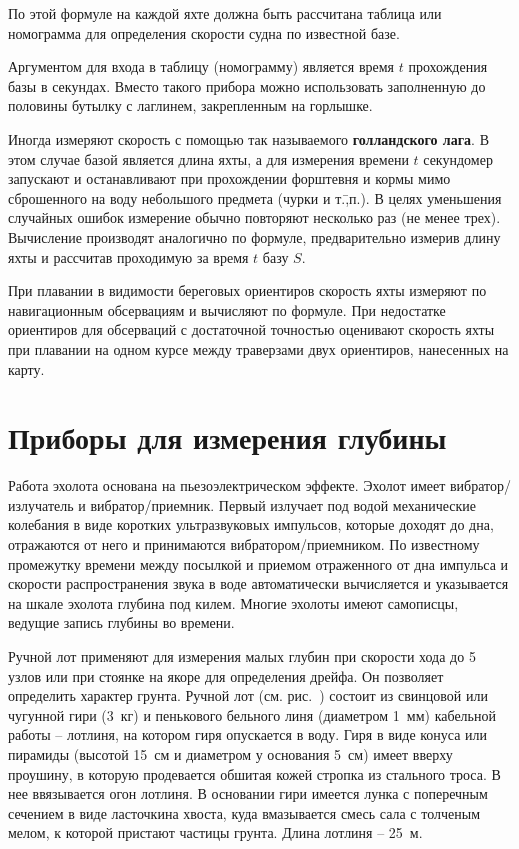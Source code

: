 По этой формуле на каждой яхте должна быть рассчитана таблица или
номограмма для определения скорости судна по известной базе.

Аргументом для входа в таблицу (номограмму) является время $t$
прохождения базы в секундах. Вместо такого прибора можно использовать
заполненную до половины бутылку с лаглинем, закрепленным на горлышке.

Иногда измеряют скорость с помощью так называемого
\textbf{голландского лага}.  В этом случае
базой является длина яхты, а для измерения времени $t$ секундомер
запускают и останавливают при прохождении форштевня и кормы мимо
сброшенного на воду небольшого предмета (чурки и т.\=,п.). В целях
уменьшения случайных ошибок измерение обычно повторяют несколько раз
(не менее трех). Вычисление производят аналогично по формуле,
предварительно измерив длину яхты и рассчитав проходимую за время $t$
базу $S$.

При плавании в видимости береговых ориентиров скорость яхты измеряют
по навигационным обсервациям и вычисляют по формуле. При недостатке
ориентиров для обсерваций с достаточной точностью оценивают скорость
яхты при плавании на одном курсе между траверзами двух ориентиров,
нанесенных на карту.

\section{Приборы для измерения глубины}

Работа эхолота основана на пьезоэлектрическом
эффекте. Эхолот имеет вибратор\-/излучатель и
вибратор\-/приемник. Первый излучает под водой механические колебания
в виде коротких ультразвуковых импульсов, которые доходят до дна,
отражаются от него и принимаются вибратором\-/приемником. По
известному промежутку времени между посылкой и приемом отраженного от
дна импульса и скорости распространения звука в воде автоматически
вычисляется и указывается на шкале эхолота глубина под килем. Многие
эхолоты имеют самописцы, ведущие запись глубины во времени.

Ручной лот применяют для измерения малых глубин при
скорости хода до 5 узлов или при стоянке на якоре для определения
дрейфа. Он позволяет определить характер грунта. Ручной лот
(см. рис.~) состоит из свинцовой или чугунной гири (3~кг) и пенькового бельного линя (диаметром 1~мм) кабельной работы
\--- лотлиня, на котором гиря опускается в воду. Гиря в виде конуса
или пирамиды (высотой 15~см и диаметром у основания 5~см) имеет вверху проушину, в которую продевается обшитая кожей
стропка из стального троса. В нее ввязывается огон лотлиня. В
основании гири имеется лунка с поперечным сечением в виде ласточкина
хвоста, куда вмазывается смесь сала с толченым мелом, к которой
пристают частицы грунта. Длина лотлиня \--- 25~м.

